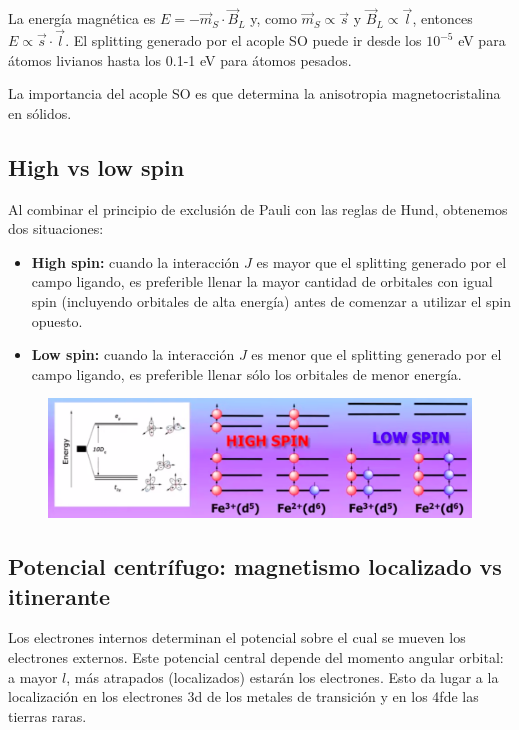   La energía magnética es $E = - \vec{m}_S \cdot \vec{B}_L$ y, como $\vec{m}_S \propto \vec{s}$ y $\vec{B}_L \propto \vec{l}$, entonces $E \propto \vec{s} \cdot \vec{l}$. El splitting generado por el acople SO puede ir desde los $10^{-5}$ eV para átomos livianos hasta los 0.1-1 eV para átomos pesados.

  La importancia del acople SO es que determina la anisotropia magnetocristalina en sólidos.

\subsection{High vs low spin}

  Al combinar el principio de exclusión de Pauli con las reglas de Hund, obtenemos dos situaciones:
    \begin{itemize}
      \item \textbf{High spin:} cuando la interacción $J$ es mayor que el splitting generado por el campo ligando, es preferible llenar la mayor cantidad de orbitales con igual spin (incluyendo orbitales de alta energía) antes de comenzar a utilizar el spin opuesto.
      \item \textbf{Low spin:} cuando la interacción $J$ es menor que el splitting generado por el campo ligando, es preferible llenar sólo los orbitales de menor energía.
    \end{itemize}

    \begin{figure}[H]
        \centering
        \includegraphics[scale = 0.5]{figs/D7/highlow.png}
    \end{figure}

\subsection{Potencial centrífugo: magnetismo localizado vs itinerante}

  Los electrones internos determinan el potencial sobre el cual se mueven los electrones externos. Este potencial central depende del momento angular orbital: a mayor $l$, más atrapados (localizados) estarán los electrones. Esto da lugar a la localización en los electrones 3d de los metales de transición y en los 4fde las tierras raras.

